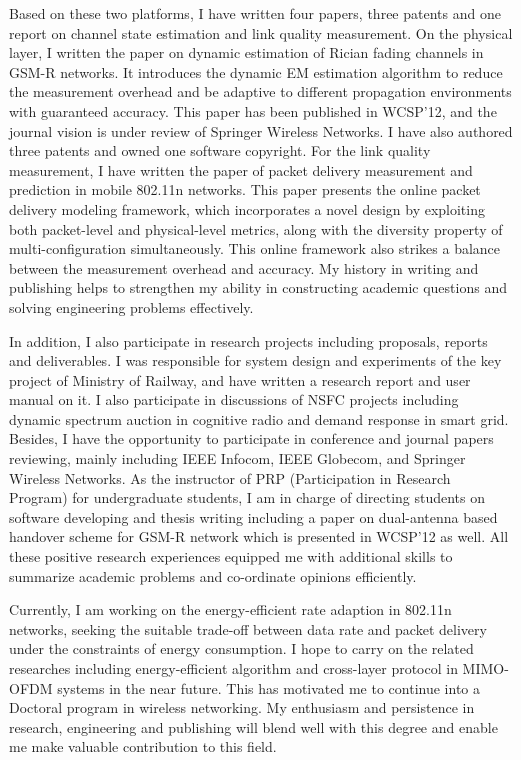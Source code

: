 \documentclass[conference,onecolumn]{IEEEtran}
\begin{document}
Based on these two platforms, I have written four papers, three patents and one report on channel state estimation and link quality measurement. On the physical layer, I written the paper on dynamic estimation of Rician fading channels in GSM-R networks. It introduces the dynamic EM estimation algorithm to reduce the measurement overhead and be adaptive to different propagation environments with guaranteed accuracy. This paper has been published in WCSP'12, and the journal vision is under review of Springer Wireless Networks. I have also authored three patents and owned one software copyright. For the link quality measurement, I have written the paper of packet delivery measurement and prediction in mobile 802.11n networks. This paper presents the online packet delivery modeling framework, which incorporates a novel design by exploiting both packet-level and physical-level metrics, along with the diversity property of multi-configuration simultaneously. This online framework also strikes a balance between the measurement overhead and accuracy. My history in writing and publishing helps to strengthen my ability in constructing academic questions and solving engineering problems effectively.

In addition, I also participate in research projects including proposals, reports and deliverables. I was responsible for system design and experiments of the key project of Ministry of Railway, and have written a research report and user manual on it. I also participate in discussions of NSFC projects including dynamic spectrum auction in cognitive radio and demand response in smart grid. Besides, I have the opportunity to participate in conference and journal papers reviewing, mainly including IEEE Infocom, IEEE Globecom, and Springer Wireless Networks. As the instructor of PRP (Participation in Research Program) for undergraduate students, I am in charge of directing students on software developing and thesis writing including a paper on dual-antenna based handover scheme for GSM-R network which is presented in WCSP'12 as well. All these positive research experiences equipped me with additional skills to summarize academic problems and co-ordinate opinions efficiently.

Currently, I am working on the energy-efficient rate adaption in 802.11n networks, seeking the suitable trade-off between data rate and packet delivery under the constraints of energy consumption. I hope to carry on the related researches including energy-efficient algorithm and cross-layer protocol in MIMO-OFDM systems in the near future. This has motivated me to continue into a Doctoral program in wireless networking. My enthusiasm and persistence in research, engineering and publishing will blend well with this degree and enable me make valuable contribution to this field.
\end{document}
